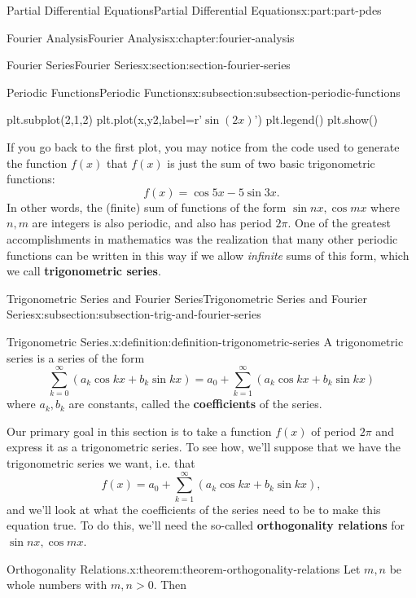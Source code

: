 \documentclass[oneside,10pt,]{book}
\newcommand{\terminology}[1]{\textbf{#1}}
\numberwithin{equation}{part}
\begin{document}
\begin{partptx}{Partial Differential Equations}{}{Partial Differential Equations}{}{}{x:part:part-pdes}
\begin{chapterptx}{Fourier Analysis}{}{Fourier Analysis}{}{}{x:chapter:fourier-analysis}
\begin{sectionptx}{Fourier Series}{}{Fourier Series}{}{}{x:section:section-fourier-series}
\begin{subsectionptx}{Periodic Functions}{}{Periodic Functions}{}{}{x:subsection:subsection-periodic-functions}
\begin{sageinput}
plt.subplot(2,1,2)
plt.plot(x,y2,label=r'$\sin(2x)$')
plt.legend()
plt.show()
\end{sageinput}
If you go back to the first plot, you may notice from the code used to generate the function \(f(x)\) that \(f(x)\) is just the sum of two basic trigonometric functions:%
\begin{equation*}
f(x) = \cos5x-5\sin3x.
\end{equation*}
In other words, the (finite) sum of functions of the form \(\sin nx,\cos mx\) where \(n,m\) are integers is also periodic, and also has period \(2\pi\). One of the greatest accomplishments in mathematics was the realization that many other periodic functions can be written in this way if we allow \emph{infinite} sums of this form, which we call \terminology{trigonometric series}.%
\end{subsectionptx}
%
%
\typeout{************************************************}
\typeout{************************************************}
%
\begin{subsectionptx}{Trigonometric Series and Fourier Series}{}{Trigonometric Series and Fourier Series}{}{}{x:subsection:subsection-trig-and-fourier-series}
\begin{definition}{Trigonometric Series.}{x:definition:definition-trigonometric-series}%
%
A trigonometric series is a series of the form%
\begin{equation*}
\sum_{k=0}^{\infty}(a_{k}\cos kx+b_{k}\sin kx) = a_{0} + \sum_{k=1}^{\infty}(a_{k}\cos kx+b_{k}\sin kx)
\end{equation*}
where \(a_{k},b_{k}\) are constants, called the \terminology{coefficients} of the series.%
\end{definition}
Our primary goal in this section is to take a function \(f(x)\) of period \(2\pi\) and express it as a trigonometric series. To see how, we'll suppose that we have the trigonometric series we want, i.e. that%
\begin{equation*}
f(x) = a_{0} + \sum_{k=1}^{\infty}(a_{k}\cos kx+b_{k}\sin kx),
\end{equation*}
and we'll look at what the coefficients of the series need to be to make this equation true. To do this, we'll need the so-called \terminology{orthogonality relations} for \(\sin nx,\cos mx\).%
\begin{theorem}{Orthogonality Relations.}{}{x:theorem:theorem-orthogonality-relations}%
%
Let \(m,n\) be whole numbers with \(m,n>0\). Then%

\end{theorem}
\end{subsectionptx}
\end{sectionptx}
\end{chapterptx}
\end{partptx}
\end{document}
